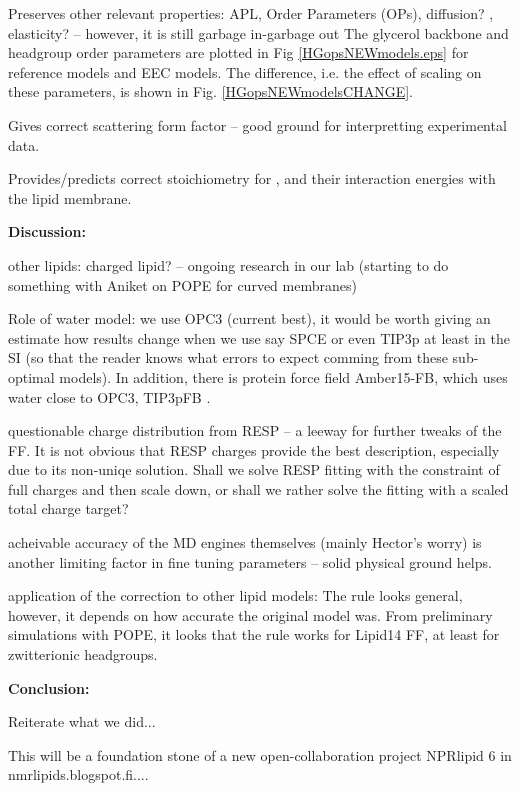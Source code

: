 \documentclass[aip,jcp]{revtex4}
\begin{document}
Preserves other relevant properties: APL, Order Parameters (OPs), diffusion? , elasticity?  -- however, it is still garbage in-garbage out
The glycerol backbone and headgroup order parameters are plotted in
Fig \ref{HGopsNEWmodels.eps} for reference models and EEC models. The difference,
i.e. the effect of scaling on these parameters, is shown in Fig. \ref{HGopsNEWmodelsCHANGE}.

Gives correct scattering form factor -- good ground for interpretting experimental data.

Provides/predicts correct stoichiometry for ,  and their interaction energies with the lipid membrane.

\textbf{Discussion:}

other lipids: charged lipid? -- ongoing research in our lab (starting to do something with Aniket on POPE for curved membranes)

Role of water model: we use OPC3 (current best), it would be worth giving an estimate how results change when we use say SPCE or even TIP3p at least in the SI (so that the reader knows what errors to expect comming from these sub-optimal models). In addition, there is protein force field Amber15-FB, which uses water close to OPC3, TIP3pFB .

questionable charge distribution from RESP -- a leeway for further tweaks of the FF.
It is not obvious that RESP charges provide the best description, especially due to its non-uniqe solution. 
Shall we solve RESP fitting with the constraint of full charges and then scale down, or shall we rather solve the fitting with a scaled total charge target?

acheivable accuracy of the MD engines themselves (mainly Hector's worry) is another limiting factor in fine tuning parameters -- solid physical ground helps.

application of the correction to other lipid models: The rule looks general, however, it depends on how accurate the original model was.
From preliminary simulations with POPE, it looks that the rule works for Lipid14 FF, at least for zwitterionic headgroups.

\textbf{Conclusion:}

Reiterate what we did...

This will be a foundation stone of a new open-collaboration project NPRlipid 6 in nmrlipids.blogspot.fi....
\end{document}
